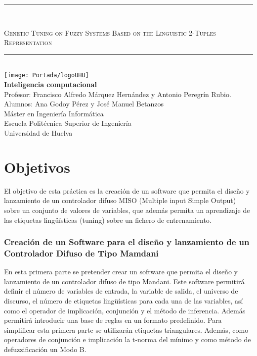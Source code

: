 \documentclass[12pt,a4paper]{article}
\begin{document}
\begin{titlepage}
\begin{center}
\rule{80mm}{0.1mm}\\		%
\bigskip
\begin{Huge}
\textsc{Genetic Tuning on Fuzzy Systems Based on the Linguistic 2-Tuples Representation\\}
\end{Huge}
\bigskip
\rule{80mm}{0.1mm}\\		%
\bigskip
\texttt{[image: Portada/logoUHU]}\\
\bigskip
\bigskip
\Large
\textbf{Inteligencia computacional}\\
\bigskip
\bigskip
\bigskip
\bigskip
\bigskip
\bigskip
Profesor: Francisco Alfredo Márquez Hernández y Antonio Peregrín Rubio.\\
Alumnos: Ana Godoy Pérez y José Manuel Betanzos\\
\bigskip
\bigskip
\bigskip
Máster en Ingeniería Informática\\
Escuela Politécnica Superior de Ingeniería\\
Universidad de Huelva\\
\end{center}
\end{titlepage}


\thispagestyle{empty}
\tableofcontents
\renewcommand{\contentsname}{Índice}
\setcounter{tocdepth}{3}
\newpage


\part*{Objetivos}
El objetivo de esta práctica es la creación de un software que permita el diseño y lanzamiento de un controlador difuso MISO (Multiple input Simple Output) sobre un conjunto de valores de variables, que además permita un aprendizaje de las etiquetas lingüísticas (tuning) sobre un fichero de entrenamiento.

\section{Creación de un Software para el diseño y lanzamiento de un Controlador Difuso de Tipo Mamdani}
En esta primera parte se pretender crear un software que permita el diseño y lanzamiento de un controlador difuso de tipo Mandani. Este software permitirá definir el número de variables de entrada, la variable de salida, el universo de discurso, el número de etiquetas lingüísticas para cada una de las variables, así como el operador de implicación, conjunción y el método de inferencia. Además permitirá introducir una base de reglas en un formato
predefinido.
Para simplificar esta primera parte se utilizarán etiquetas triangulares. Además, como operadores de
conjunción e implicación la t-norma del mínimo y como método de defuzzificación un Modo B.
\end{document}

